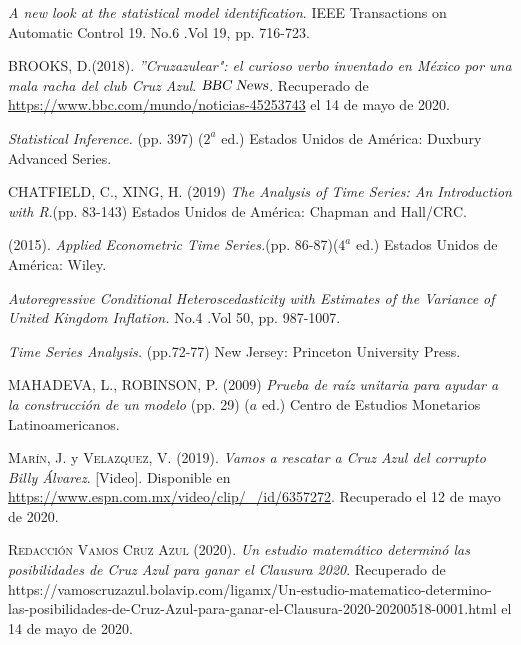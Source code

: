\documentclass{article}
\theoremstyle{remark}
\begin{document}
\newpage
\begin{thebibliography}{X}
 \textit{A new look at the statistical model identification}. IEEE Transactions on Automatic Control 19. No.6 .Vol 19, pp. 716-723.

 \textsc{BROOKS, D.(2018)}. \textit{''Cruzazulear": el curioso verbo inventado en México por una mala racha del club Cruz Azul}. $\textsl{BBC News}$. Recuperado de \url{https://www.bbc.com/mundo/noticias-45253743} el 14 de mayo de 2020.

  \textit{Statistical Inference.} (pp. 397) (\(2^{a}\) ed.) Estados Unidos de América: Duxbury Advanced Series.  

 \textsc{CHATFIELD, C., XING, H. (2019)} \textit{The Analysis of Time Series: An Introduction with R}.(pp. 83-143) Estados Unidos de América: Chapman and Hall/CRC.

   (2015). \textit{Applied Econometric Time Series.}(pp. 86-87)(\(4^{a}\) ed.)  Estados Unidos de América: Wiley.

  \textit{Autoregressive Conditional Heteroscedasticity with Estimates of the Variance of United Kingdom Inflation.} No.4 .Vol 50, pp. 987-1007.

  \textit{Time Series Analysis.} (pp.72-77) New Jersey: Princeton University Press. 

 \textsc{MAHADEVA, L., ROBINSON, P. (2009)} \textit{Prueba de raíz unitaria para ayudar a la construcción de un modelo} (pp. 29) (\(a\) ed.) Centro de Estudios Monetarios Latinoamericanos.

 \textsc{Marín, J.} y \textsc{Velazquez, V. (2019)}. \textit{Vamos a rescatar a Cruz Azul del corrupto Billy Álvarez}. [Video]. Disponible en \url{https://www.espn.com.mx/video/clip/_/id/6357272}. Recuperado el 12 de mayo de 2020.

 \textsc{Redacción Vamos Cruz Azul (2020)}. \textit{Un estudio matemático determinó las posibilidades de Cruz Azul para ganar el Clausura 2020}. Recuperado de
https://vamoscruzazul.bolavip.com/ligamx/Un-estudio-matematico-determino-las-posibilidades-de-Cruz-Azul-para-ganar-el-Clausura-2020-20200518-0001.html el 14 de mayo de 2020.


\end{thebibliography}
\end{document}
